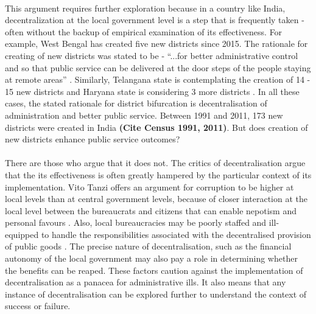 \documentclass[12pt, a4paper]{article}
\begin{document}
\paragraph{} This argument requires further exploration because in a country like India, decentralization at the local government level is a step that is frequently taken - often without the backup of empirical examination of its effectiveness. For example, West Bengal has created five new districts since 2015. The rationale for creating of new districts was stated to be - ``...for better administrative control and so that public service can be delivered at the door steps of the people staying at remote areas'' \parencite{Mamata}. Similarly, Telangana state is contemplating the creation of 14 - 15 new districts \parencite{Telengana} and Haryana state is considering 3 more districts \parencite{Haryana}. In all these cases, the stated rationale for district bifurcation is decentralisation of administration and better public service. Between 1991 and 2011, 173 new districts were created in India \textbf{(Cite Census 1991, 2011)}. But does creation of new districts enhance public service outcomes?
\paragraph{}There are those who argue that it does not. The critics of decentralisation argue that the its effectiveness is often greatly hampered by the particular context of its implementation. Vito Tanzi offers an argument for corruption to be higher at local levels than at central government levels, because of closer interaction at the local level between the bureaucrats and citizens that can enable nepotism and personal favours \parencite{tanzi1996macroeconomic}. Also, local bureaucracies may be poorly staffed and ill-equipped to handle the responsibilities associated with the decentralised provision of public goods \parencite{prud1995dangers}. The precise nature of decentralisation, such as the financial autonomy of the local government may also pay a role in determining whether the benefits can be reaped. These factors caution against the implementation of decentralisation as a panacea for administrative ills. It also means that any instance of decentralisation can be explored further to understand the context of success or failure.
\end{document}
